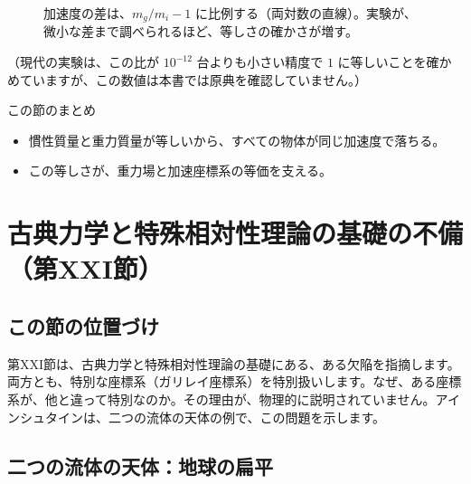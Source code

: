 \documentclass[a4paper,11pt,openany]{ltjsbook}
\begin{document}
\begin{figure}[htbp]
\centering
{}
\caption{加速度の差は、$m_g/m_i-1$ に比例する（両対数の直線）。実験が、微小な差まで調べられるほど、等しさの確かさが増す。}
\end{figure}

（現代の実験は、この比が $10^{-12}$ 台よりも小さい精度で $1$ に等しいことを確かめていますが、この数値は本書では原典を確認していません。）

\begin{pointbox}{この節のまとめ}
\begin{itemize}[leftmargin=*]
\item 慣性質量と重力質量が等しいから、すべての物体が同じ加速度で落ちる。
\item この等しさが、重力場と加速座標系の等価を支える。
\end{itemize}
\end{pointbox}

\chapter{古典力学と特殊相対性理論の基礎の不備（第XXI節）}

\section{この節の位置づけ}

第XXI節は、古典力学と特殊相対性理論の基礎にある、ある欠陥を指摘します。両方とも、特別な座標系（ガリレイ座標系）を特別扱いします。なぜ、ある座標系が、他と違って特別なのか。その理由が、物理的に説明されていません。アインシュタインは、二つの流体の天体の例で、この問題を示します。

\section{二つの流体の天体：地球の扁平}
\end{document}
